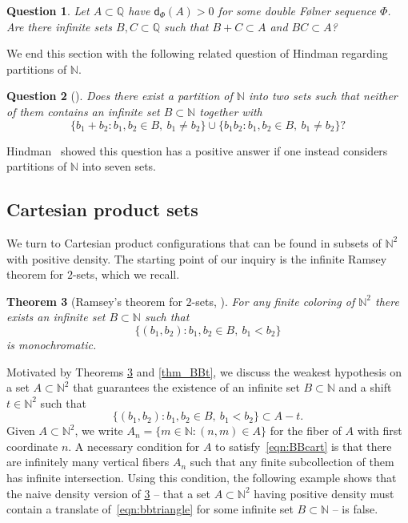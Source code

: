 \documentclass[10pt,dvipsnames]{article}
\newtheorem{theorem}{Theorem}[section]
\newtheorem{question}[theorem]{Question}
\theoremstyle{definition}
\theoremstyle{plain}
\newcommand{\Q}{\mathbb{Q}}
\newcommand{\N}{\mathbb{N}}
\newcommand{\dens}{\mathsf{d}}
\newcommand{\Folner}{F\o{}lner}
\begin{document}
\begin{question}
Let $A\subset\Q$ have $\dens_\Phi(A)>0$ for some double \Folner{} sequence $\Phi$. 
Are there infinite sets $B,C\subset\Q$ such that $B+C \subset A$ and $BC \subset A$?
\end{question}

We end this section with the following related question of Hindman regarding partitions of $\N$.

\begin{question}[{\cite[3.1 Question~(a)]{Hindman80}}]
\label{q_hindman80_31_Qa}
Does there exist a partition of $\N$ into two sets such that neither of them contains an infinite set $B\subset\N$ together with 
\[
\{b_1+b_2: b_1,b_2\in B,~b_1\neq b_2\}\cup\{b_1b_2: b_1,b_2\in B,~b_1\neq b_2\}?
\]
\end{question}

Hindman~\cite{Hindman80} showed this question has a positive answer if one instead considers partitions of $\N$ into seven sets. 



\subsection{Cartesian product sets}
We turn to Cartesian product configurations that can be found in subsets of $\N^2$ with positive density.
The starting point of our inquiry is the infinite Ramsey theorem for $2$-sets, which we recall.



\begin{theorem}[Ramsey's theorem for $2$-sets, \cite{ramsey}]
\label{thm_ramsey_2_sets}
For any finite coloring of $\N^2$ there exists an infinite set $B\subset\N$ such that
\begin{equation}
\label{eqn:bbtriangle}
\{(b_1,b_2): b_1,b_2\in B,~b_1<b_2\}
\end{equation}is monochromatic.
\end{theorem}

Motivated by Theorems \ref{thm_ramsey_2_sets} and \ref{thm_BBt}, we discuss the weakest hypothesis on a set $A \subset \N^2$ that guarantees the existence of an infinite set $B \subset \N$ and a shift $t \in \N^2$ such that 
\begin{equation}
\label{eqn:BBcart}
\big\{(b_1,b_2): b_1,b_2\in B,~b_1<b_2\big\}\subset A-t.
\end{equation}
Given $A\subset\N^2$, we write $A_n=\{m\in\N: (n,m)\in A\}$ for the fiber of $A$ with first coordinate $n$. 
A necessary condition for $A$ to satisfy~\eqref{eqn:BBcart} is that there are  infinitely many vertical fibers $A_n$ such that any finite subcollection of them has infinite intersection. 
Using this condition, the following example shows that the naive density version of \cref{thm_ramsey_2_sets} -- that a set $A \subset \N^2$ having positive density must contain a translate of~\eqref{eqn:bbtriangle} for some infinite set $B \subset \N$ -- is false.
\end{document}
